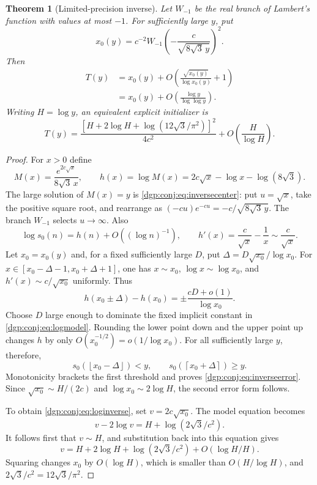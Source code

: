 \documentclass[11pt,letterpaper]{article}
\numberwithin{equation}{section}
\newtheorem{theorem}{Theorem}[section]
\theoremstyle{remark}\newtheorem{remark}[theorem]{Remark}
\newcommand{\floor}[1]{\left\lfloor #1\right\rfloor}
\newcommand{\ceil}[1]{\left\lceil #1\right\rceil}
\begin{document}
\begin{theorem}[Limited-precision inverse]\label{dgp:conj:thm:inverse}
Let $W_{-1}$ be the real branch of Lambert's function with values at
most $-1$. For sufficiently large $y$, put
\begin{equation}\label{dgp:conj:eq:inversecenter}
 x_0(y)=c^{-2}
 W_{-1}\!\left(-\frac{c}{\sqrt{8\sqrt3\,y}}\right)^2.
\end{equation}
Then
\begin{align}
 T(y)&=x_0(y)+O\left(\frac{\sqrt{x_0(y)}}{\log x_0(y)}+1\right)\label{dgp:conj:eq:inverseerror}\\
 &=x_0(y)+O\left(\frac{\log y}{\log\log y}\right).\nonumber
\end{align}
Writing $H=\log y$, an equivalent explicit initializer is
\begin{equation}\label{dgp:conj:eq:loginverse}
 T(y)=\frac{\left[H+2\log H+\log(12\sqrt3/\pi^2)\right]^2}{4c^2}
       +O\left(\frac{H}{\log H}\right).
\end{equation}
\end{theorem}
\begin{proof}
For $x>0$ define
\[
 M(x)=\frac{e^{2c\sqrt x}}{8\sqrt3\,x},\qquad
 h(x)=\log M(x)=2c\sqrt x-\log x-\log(8\sqrt3).
\]
The large solution of $M(x)=y$ is \eqref{dgp:conj:eq:inversecenter}:
put $u=\sqrt x$, take the positive square root, and rearrange as
$(-cu)e^{-cu}=-c/\sqrt{8\sqrt3\,y}$. The branch $W_{-1}$
selects $u\to\infty$. Also
\begin{equation}\label{dgp:conj:eq:logmodel}
 \log s_0(n)=h(n)+O((\log n)^{-1}),\qquad
 h'(x)=\frac c{\sqrt x}-\frac1x\sim\frac c{\sqrt x}.
\end{equation}
Let $x_0=x_0(y)$ and, for a fixed sufficiently large $D$, put
$\Delta=D\sqrt{x_0}/\log x_0$. For
$x\in[x_0-\Delta-1,x_0+\Delta+1]$, one has $x\sim x_0$,
$\log x\sim\log x_0$, and $h'(x)\sim c/\sqrt{x_0}$ uniformly.
Thus
\[
 h(x_0\pm\Delta)-h(x_0)
 =\pm\frac{cD+o(1)}{\log x_0}.
\]
Choose $D$ large enough to dominate the fixed implicit constant
in \eqref{dgp:conj:eq:logmodel}. Rounding the lower point down and the upper
point up changes $h$ by only $O(x_0^{-1/2})=o(1/\log x_0)$.
For all sufficiently large $y$, therefore,
\[
 s_0(\floor{x_0-\Delta})<y,
 \qquad s_0(\ceil{x_0+\Delta})\geq y.
\]
Monotonicity brackets the first threshold and proves
\eqref{dgp:conj:eq:inverseerror}. Since $\sqrt{x_0}\sim H/(2c)$ and
$\log x_0\sim2\log H$, the second error form follows.

To obtain \eqref{dgp:conj:eq:loginverse}, set $v=2c\sqrt{x_0}$.
The model equation becomes
\[
 v-2\log v=H+\log(2\sqrt3/c^2).
\]
It follows first that $v\sim H$, and substitution back into this
equation gives
\[
 v=H+2\log H+\log(2\sqrt3/c^2)+O(\log H/H).
\]
Squaring changes $x_0$ by $O(\log H)$, which is smaller than
$O(H/\log H)$, and $2\sqrt3/c^2=12\sqrt3/\pi^2$.
\end{proof}
\end{document}
